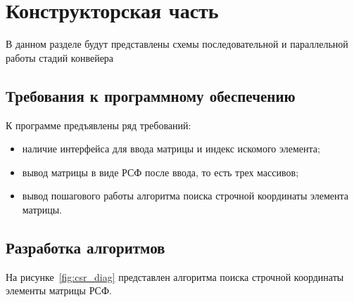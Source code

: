 \chapter{Конструкторская часть}

В данном разделе будут представлены схемы последовательной и параллельной работы стадий конвейера

\section{Требования к программному обеспечению}

К программе предъявлены ряд требований:

\begin{itemize}[label=---]
	\item наличие интерфейса для ввода матрицы и индекс искомого элемента;
	\item вывод матрицы в виде РСФ после ввода, то есть трех массивов;
	\item вывод пошагового работы алгоритма поиска строчной координаты элемента матрицы.
\end{itemize}

\section{Разработка алгоритмов}

На рисунке~\ref{fig:csr_diag} представлен алгоритма поиска строчной координаты элементы матрицы РСФ.

